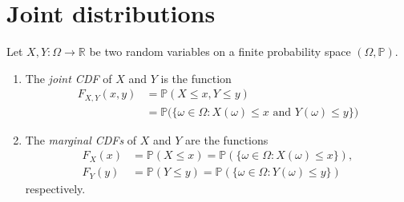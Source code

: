 \documentclass[lecture]{csm}
\newcommand{\R}{\mathbb{R}}
\newcommand{\prob}{\mathbb{P}}
\def\it{\item}
\def\bit{\begin{itemize}}
\def\eit{\end{itemize}}
\def\ben{\begin{enumerate}}
\def\een{\end{enumerate}}
\begin{document}
\maketitle
\tableofcontents

%

\section{Joint distributions}
\begin{definition}
Let $X,Y:\Omega\to\R$ be two random variables on a finite probability space $(\Omega,\prob)$.
\ben
\it The \emph{joint CDF} of $X$ and $Y$ is the function
\begin{align*}
F_{X,Y}(x,y) 
	& = \prob(X\leq x, Y\leq y) \\
	& = \prob\big(\{\omega\in\Omega : X(\omega)\leq x \text{ and } Y(\omega)\leq y\}\big)
\end{align*}

\it The \emph{marginal CDFs} of $X$ and $Y$ are the functions
\begin{align*}
F_X(x)	& = \prob(X\leq x) = \prob(\{\omega\in\Omega : X(\omega)\leq x\}), \\
F_Y(y)	& = \prob(Y\leq y) = \prob(\{\omega\in\Omega : Y(\omega)\leq y\})
\end{align*}
respectively.
\een
\end{definition}
\end{document}
